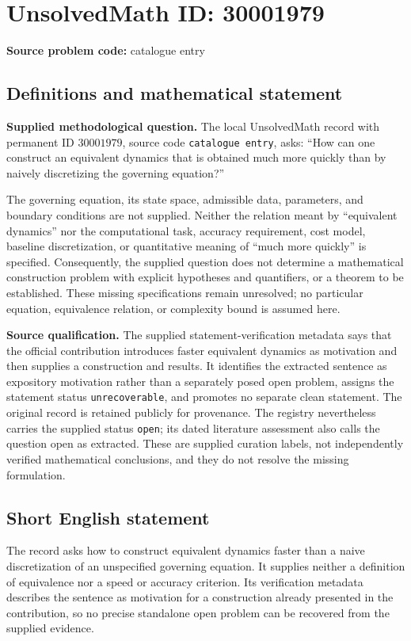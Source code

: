 \documentclass[11pt]{article}
\begin{document}
\section*{UnsolvedMath ID: 30001979}
\textbf{Source problem code:} catalogue entry
\subsection{Definitions and mathematical statement}
\textbf{Supplied methodological question.} The local UnsolvedMath record with permanent ID \(30001979\), source code \texttt{catalogue entry}, asks: ``How can one construct an equivalent dynamics that is obtained much more quickly than by naively discretizing the governing equation?''

The governing equation, its state space, admissible data, parameters, and boundary conditions are not supplied. Neither the relation meant by ``equivalent dynamics'' nor the computational task, accuracy requirement, cost model, baseline discretization, or quantitative meaning of ``much more quickly'' is specified. Consequently, the supplied question does not determine a mathematical construction problem with explicit hypotheses and quantifiers, or a theorem to be established. These missing specifications remain unresolved; no particular equation, equivalence relation, or complexity bound is assumed here.

\textbf{Source qualification.} The supplied statement-verification metadata says that the official contribution introduces faster equivalent dynamics as motivation and then supplies a construction and results. It identifies the extracted sentence as expository motivation rather than a separately posed open problem, assigns the statement status \texttt{unrecoverable}, and promotes no separate clean statement. The original record is retained publicly for provenance. The registry nevertheless carries the supplied status \texttt{open}; its dated literature assessment also calls the question open as extracted. These are supplied curation labels, not independently verified mathematical conclusions, and they do not resolve the missing formulation.
\subsection{Short English statement}
The record asks how to construct equivalent dynamics faster than a naive discretization of an unspecified governing equation. It supplies neither a definition of equivalence nor a speed or accuracy criterion. Its verification metadata describes the sentence as motivation for a construction already presented in the contribution, so no precise standalone open problem can be recovered from the supplied evidence.
\end{document}
